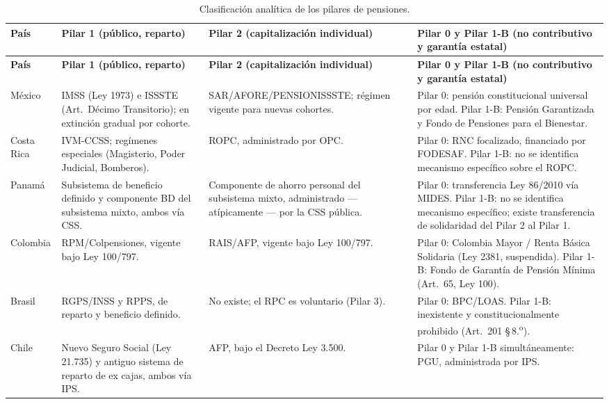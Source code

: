 \documentclass[12pt, letterpaper]{article}
\begin{document}
\begin{xltabular}{\textwidth}{P{1.7cm}Y Y Y}
\caption{Clasificación analítica de los pilares de pensiones.}
\label{tab:sspsas}\\
\toprule
\textbf{País} & \textbf{Pilar 1 (público, reparto)} & \textbf{Pilar 2 (capitalización individual)} & \textbf{Pilar 0 y Pilar 1-B (no contributivo y garantía estatal)} \\
\midrule
\endfirsthead

\toprule
\textbf{País} & \textbf{Pilar 1 (público, reparto)} & \textbf{Pilar 2 (capitalización individual)} & \textbf{Pilar 0 y Pilar 1-B (no contributivo y garantía estatal)} \\
\midrule
\endhead

\bottomrule
\endfoot

México &
IMSS (Ley 1973) e ISSSTE (Art.\ Décimo Transitorio); en extinción gradual por cohorte. &
SAR/AFORE/PENSIONISSSTE; régimen vigente para nuevas cohortes. &
Pilar 0: pensión constitucional universal por edad. Pilar 1-B: Pensión Garantizada y Fondo de Pensiones para el Bienestar. \\

Costa Rica &
IVM-CCSS; regímenes especiales (Magisterio, Poder Judicial, Bomberos). &
ROPC, administrado por OPC. &
Pilar 0: RNC focalizado, financiado por FODESAF. Pilar 1-B: no se identifica mecanismo específico sobre el ROPC. \\

Panamá &
Subsistema de beneficio definido y componente BD del subsistema mixto, ambos vía CSS. &
Componente de ahorro personal del subsistema mixto, administrado --- atípicamente --- por la CSS pública. &
Pilar 0: transferencia Ley 86/2010 vía MIDES. Pilar 1-B: no se identifica mecanismo específico; existe transferencia de solidaridad del Pilar 2 al Pilar 1. \\

Colombia &
RPM/Colpensiones, vigente bajo Ley 100/797. &
RAIS/AFP, vigente bajo Ley 100/797. &
Pilar 0: Colombia Mayor / Renta Básica Solidaria (Ley 2381, suspendida). Pilar 1-B: Fondo de Garantía de Pensión Mínima (Art.\ 65, Ley 100). \\

Brasil &
RGPS/INSS y RPPS, de reparto y beneficio definido. &
No existe; el RPC es voluntario (Pilar 3). &
Pilar 0: BPC/LOAS. Pilar 1-B: inexistente y constitucionalmente prohibido (Art.\ 201 \S\,8.\textsuperscript{o}). \\

Chile &
Nuevo Seguro Social (Ley 21.735) y antiguo sistema de reparto de ex cajas, ambos vía IPS. &
AFP, bajo el Decreto Ley 3.500. &
Pilar 0 y Pilar 1-B simultáneamente: PGU, administrada por IPS. \\

\end{xltabular}
\end{document}
